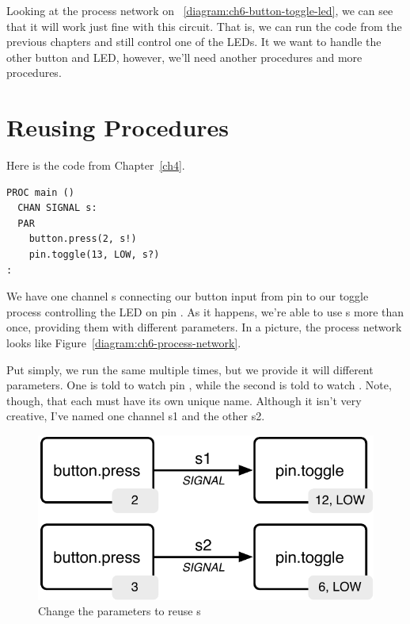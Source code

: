 \newpage

Looking at the process network on ~\vref{diagram:ch6-button-toggle-led}, we can see that it will work just fine with this circuit. That is, we can run the code from the previous chapters and still control one of the LEDs. It we want to handle the other button and LED, however, we'll need another \bp procedures and more \tp procedures.

\section{Reusing Procedures}
Here is the code from Chapter~\ref{ch4}.

\vspace{3mm}
\begin{lstlisting}
PROC main ()
  CHAN SIGNAL s:
  PAR
    button.press(2, s!)
    pin.toggle(13, LOW, s?)
:
\end{lstlisting}

We have one channel {\code s} connecting our button input from pin {} to our toggle process controlling the LED on pin {}. As it happens, we're able to use {\PROCedure}s more than once, providing them with different parameters. In a picture, the process network looks like Figure~\vref{diagram:ch6-process-network}. 

Put simply, we run the same \PROCedure multiple times, but we provide it will different parameters. One \bp is told to watch pin \pintwo, while the second \bp is told to watch \pinthree. Note, though, that each \CHANnel must have its own unique name. Although it isn't very creative, I've named one channel {\code s1} and the other {\code s2}. 

\newpage

\begin{figure}[ht]
  \begin{center}
    \includegraphics[width=0.8\linewidth]{images/ch6-process-network}
    \caption{Change the parameters to reuse {\PROCedure}s}
    \label{diagram:ch6-process-network}
  \end{center}
\end{figure}

